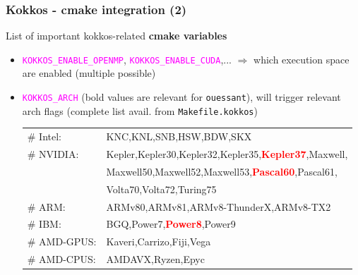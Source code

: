 \begin{frame}[fragile=singleslide]
  \frametitle{Kokkos - cmake integration (2)}

  {\large List of important kokkos-related {\bf cmake variables}}
  \begin{itemize}
  \item \textcolor{magenta}{\texttt{KOKKOS\_ENABLE\_OPENMP}}, \textcolor{magenta}{\texttt{KOKKOS\_ENABLE\_CUDA}},... $\Rightarrow$ which execution space are enabled (multiple possible)
  \item \textcolor{magenta}{\texttt{KOKKOS\_ARCH}} (bold values are relevant for \texttt{ouessant}), will trigger relevant arch flags (complete list avail. from \texttt{Makefile.kokkos})
    \begin{tabular}{ll}
      \# Intel:    & KNC,KNL,SNB,HSW,BDW,SKX\\
    \# NVIDIA:   & Kepler,Kepler30,Kepler32,Kepler35,\textcolor{red}{\bf Kepler37},Maxwell,\\
      & Maxwell50,Maxwell52,Maxwell53,\textcolor{red}{\bf Pascal60},Pascal61,\\
      & Volta70,Volta72,Turing75\\
    \# ARM:      &ARMv80,ARMv81,ARMv8-ThunderX,ARMv8-TX2\\
    \# IBM:      &BGQ,Power7,\textcolor{red}{\bf Power8},Power9\\
    \# AMD-GPUS: &Kaveri,Carrizo,Fiji,Vega\\
    \# AMD-CPUS: &AMDAVX,Ryzen,Epyc\\
    \end{tabular}
  \end{itemize}

\end{frame}


